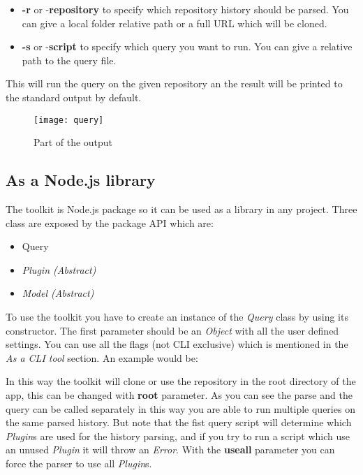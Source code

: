 \begin{itemize}
	\item \textbf{-r} or -\textbf{repository} to specify which repository history should be parsed. You can give a local folder relative path or a full URL which will be cloned.
	\item \textbf{-s} or -\textbf{script} to specify which query you want to run. You can give a relative path to the query file.
\end{itemize}

This will run the query on the given repository an the result will be printed to the standard output by default.

\begin{figure}[H]
	\centering
	\texttt{[image: query]}
	\caption{Part of the output}
	\label{fig:fig-query}
\end{figure}


\subsection{As a Node.js library}

The toolkit is Node.js package so it can be used as a library in any project.
Three class are exposed by the package API which are:

\begin{itemize}
	\item Query
	\item \textit{Plugin (Abstract)}
	\item \textit{Model (Abstract)}
\end{itemize}

To use the toolkit you have to create an instance of the \textit{Query} class by using its constructor.
The first parameter should be an \textit{Object} with all the user defined settings. 
You can use all the flags (not CLI exclusive) which is mentioned in the \textit{As a CLI tool} section.
An example would be:



In this way the toolkit will clone or use the repository in the root directory of the app, this can be changed with \textbf{root} parameter.
As you can see the parse and the query can be called separately in this way you are able to run multiple queries on the same parsed history.
But note that the fist query script will determine which \textit{Plugin}s are used for the history parsing, and if you try to run a script which
use an unused \textit{Plugin} it will throw an \textit{Error}. With the \textbf{useall} parameter you can force the parser to use all \textit{Plugin}s.


